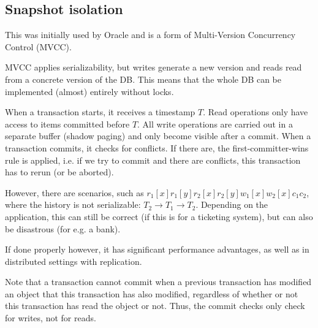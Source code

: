 \newpage
\subsection{Snapshot isolation}
This was initially used by Oracle and is a form of Multi-Version Concurrency Control (MVCC).

MVCC applies serializability, but writes generate a new version and reads read from a concrete version of the DB.
This means that the whole DB can be implemented (almost) entirely without locks.

When a transaction starts, it receives a timestamp $T$.
Read operations only have access to items committed before $T$.
All write operations are carried out in a separate buffer (shadow paging) and only become visible after a commit.
When a transaction commits, it checks for conflicts. If there are, the first-committer-wins rule is applied, i.e. if we try to commit and there are conflicts,
this transaction has to rerun (or be aborted).

However, there are scenarios, such as $r_1[x] r_1[y] r_2[x] r_2[y] w_1[x] w_2[x] c_1 c_2$, where the history is not serializable:
$T_2 \rightarrow T_1 \rightarrow T_2$.
Depending on the application, this can still be correct (if this is for a ticketing system), but can also be disastrous (for e.g. a bank).

If done properly however, it has significant performance advantages, as well as in distributed settings with replication.

Note that a transaction cannot commit when a previous transaction has modified an object that this transaction has also modified,
regardless of whether or not this transaction has read the object or not.
Thus, the commit checks only check for writes, not for reads.
